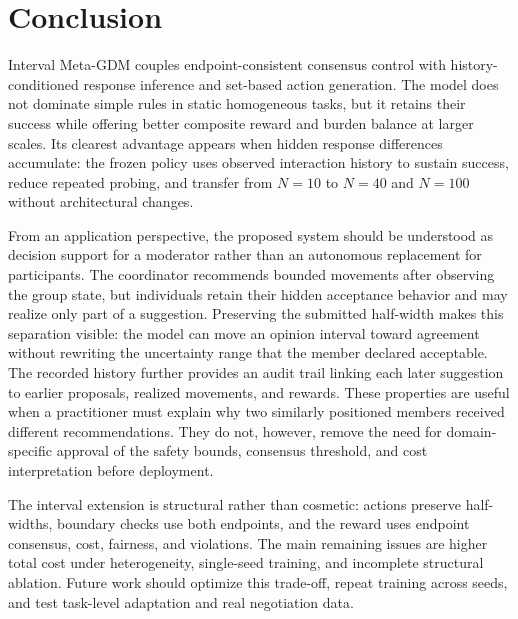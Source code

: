\documentclass[journal]{IEEEtran}
\begin{document}
\FloatBarrier
\section{Conclusion}
\label{sec:conclusion}

Interval Meta-GDM couples endpoint-consistent consensus control with history-conditioned response inference and set-based action generation. The model does not dominate simple rules in static homogeneous tasks, but it retains their success while offering better composite reward and burden balance at larger scales. Its clearest advantage appears when hidden response differences accumulate: the frozen policy uses observed interaction history to sustain success, reduce repeated probing, and transfer from $N=10$ to $N=40$ and $N=100$ without architectural changes.


From an application perspective, the proposed system should be understood as decision support for a moderator rather than an autonomous replacement for participants. The coordinator recommends bounded movements after observing the group state, but individuals retain their hidden acceptance behavior and may realize only part of a suggestion. Preserving the submitted half-width makes this separation visible: the model can move an opinion interval toward agreement without rewriting the uncertainty range that the member declared acceptable. The recorded history further provides an audit trail linking each later suggestion to earlier proposals, realized movements, and rewards. These properties are useful when a practitioner must explain why two similarly positioned members received different recommendations. They do not, however, remove the need for domain-specific approval of the safety bounds, consensus threshold, and cost interpretation before deployment.

The interval extension is structural rather than cosmetic: actions preserve half-widths, boundary checks use both endpoints, and the reward uses endpoint consensus, cost, fairness, and violations. The main remaining issues are higher total cost under heterogeneity, single-seed training, and incomplete structural ablation. Future work should optimize this trade-off, repeat training across seeds, and test task-level adaptation and real negotiation data.
\end{document}
